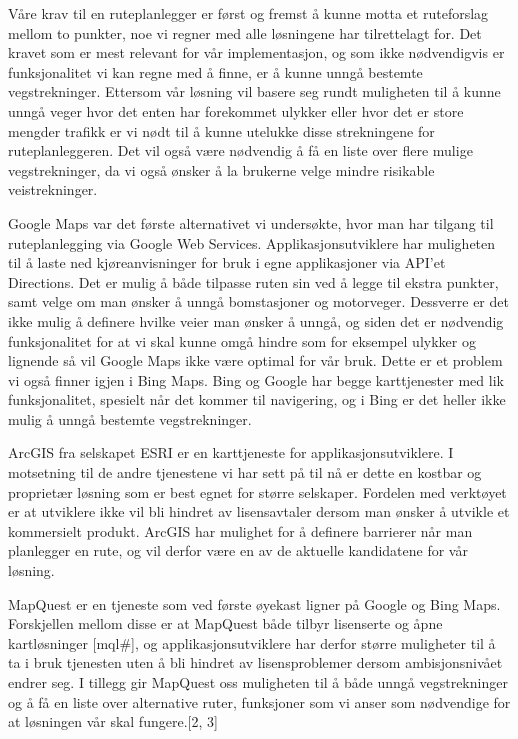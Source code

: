 \documentclass[a4paper,norsk,oneside]{book}
\begin{document}
Våre krav til en ruteplanlegger er først og fremst å kunne motta et ruteforslag mellom to punkter, noe vi regner med alle løsningene har tilrettelagt for. Det kravet som er mest relevant for vår implementasjon, og som ikke nødvendigvis er funksjonalitet vi kan regne med å finne, er å kunne unngå bestemte vegstrekninger. Ettersom vår løsning vil basere seg rundt muligheten til å kunne unngå veger hvor det enten har forekommet ulykker eller hvor det er store mengder trafikk er vi nødt til å kunne utelukke disse strekningene for ruteplanleggeren. Det vil også være nødvendig å få en liste over flere mulige vegstrekninger, da vi også ønsker å la brukerne velge mindre risikable veistrekninger.
	
Google Maps var det første alternativet vi undersøkte, hvor man har tilgang til ruteplanlegging via Google Web Services. Applikasjonsutviklere har muligheten til å laste ned kjøreanvisninger for bruk i egne applikasjoner via API’et Directions. Det er mulig å både tilpasse ruten sin ved å legge til ekstra punkter, samt velge om man ønsker å unngå bomstasjoner og motorveger. Dessverre er det ikke mulig å definere hvilke veier man ønsker å unngå, og siden det er nødvendig funksjonalitet for at vi skal kunne omgå hindre som for eksempel ulykker og lignende så vil Google Maps ikke være optimal for vår bruk. Dette er et problem vi også finner igjen i Bing Maps. Bing og Google har begge karttjenester med lik funksjonalitet, spesielt når det kommer til navigering, og i Bing er det heller ikke mulig å unngå bestemte vegstrekninger.
	
ArcGIS fra selskapet ESRI er en karttjeneste for applikasjonsutviklere. I motsetning til de andre tjenestene vi har sett på til nå er dette en kostbar og proprietær løsning som er best egnet for større selskaper. Fordelen med verktøyet er at utviklere ikke vil bli hindret av lisensavtaler dersom man ønsker å utvikle et kommersielt produkt. ArcGIS har mulighet for å definere barrierer når man planlegger en rute, og vil derfor være en av de aktuelle kandidatene for vår løsning.
	
MapQuest er en tjeneste som ved første øyekast ligner på Google og Bing Maps. Forskjellen mellom disse er at MapQuest både tilbyr lisenserte og åpne kartløsninger [mql\#], og applikasjonsutviklere har derfor større muligheter til å ta i bruk tjenesten uten å bli hindret av lisensproblemer dersom ambisjonsnivået endrer seg. I tillegg gir MapQuest oss muligheten til å både unngå vegstrekninger og å få en liste over alternative ruter, funksjoner som vi anser som nødvendige for at løsningen vår skal fungere.[2, 3]
\end{document}
